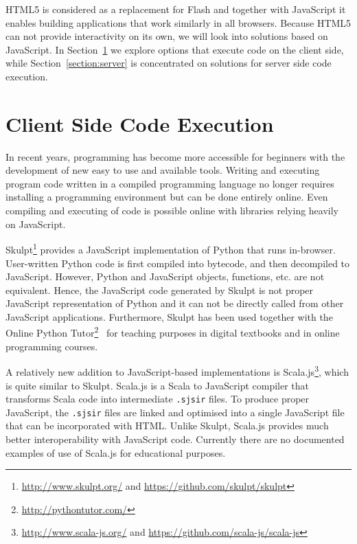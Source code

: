 HTML5 is considered as a replacement for Flash and together with JavaScript it enables building applications that work similarly in all browsers. Because HTML5 can not provide interactivity on its own, we will look into solutions based on JavaScript. In Section~\ref{section:client} we explore options that execute code on the client side, while Section~\ref{section:server} is concentrated on solutions for server side code execution.


\section{Client Side Code Execution}
\label{section:client}

In recent years, programming has become more accessible for beginners with the development of new easy to use and available tools. Writing and executing program code written in a compiled programming language no longer requires installing a programming environment but can be done entirely online. Even compiling and executing of code is possible online with libraries relying heavily on JavaScript.

Skulpt\footnote{ \url{http://www.skulpt.org/} and \url{https://github.com/skulpt/skulpt}} provides a JavaScript implementation of Python that runs in-browser. User-written Python code is first compiled into bytecode, and then decompiled to JavaScript. However, Python and JavaScript objects, functions, etc. are not equivalent. Hence, the JavaScript code generated by Skulpt is not proper JavaScript representation of Python and it can not be directly called from other JavaScript applications. Furthermore, Skulpt has been used together with the Online Python Tutor\footnote{ \url{http://pythontutor.com/}}~\cite{guo:2013} for teaching purposes in digital textbooks and in online programming courses.

A relatively new addition to JavaScript-based implementations is Scala.js\footnote{ \url{http://www.scala-js.org/} and \url{https://github.com/scala-js/scala-js}}, which is quite similar to Skulpt. Scala.js is a Scala to JavaScript compiler that transforms Scala code into intermediate \texttt{.sjsir} files. To produce proper JavaScript, the \texttt{.sjsir} files are linked and optimised into a single JavaScript file that can be incorporated with HTML. Unlike Skulpt, Scala.js provides much better interoperability with JavaScript code. Currently there are no documented examples of use of Scala.js for educational purposes.

